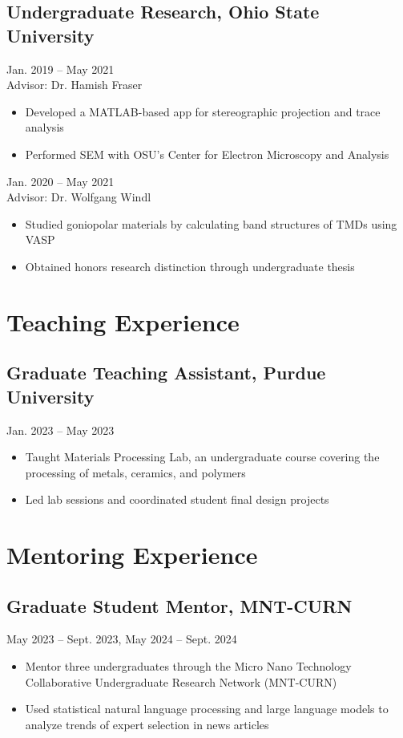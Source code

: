 \documentclass[11pt]{article}
\begin{document}
\subsection*{Undergraduate Research, Ohio State University}
Jan. 2019 -- May 2021 \\
Advisor: Dr. Hamish Fraser
\begin{itemize}[leftmargin=1.5em]
    \item Developed a MATLAB-based app for stereographic projection and trace analysis
    \item Performed SEM with OSU’s Center for Electron Microscopy and Analysis
\end{itemize}

Jan. 2020 -- May 2021 \\
Advisor: Dr. Wolfgang Windl
\begin{itemize}[leftmargin=1.5em]
    \item Studied goniopolar materials by calculating band structures of TMDs using VASP
    \item Obtained honors research distinction through undergraduate thesis
\end{itemize}

\section*{Teaching Experience}

\subsection*{Graduate Teaching Assistant, Purdue University}
Jan. 2023 -- May 2023
\begin{itemize}[leftmargin=1.5em]
    \item Taught Materials Processing Lab, an undergraduate course covering the processing of metals, ceramics, and polymers
    \item Led lab sessions and coordinated student final design projects
\end{itemize}

\section*{Mentoring Experience}

\subsection*{Graduate Student Mentor, MNT-CURN}
May 2023 -- Sept. 2023, May 2024 -- Sept. 2024
\begin{itemize}[leftmargin=1.5em]
    \item Mentor three undergraduates through the Micro Nano Technology Collaborative Undergraduate Research Network (MNT-CURN)
    \item Used statistical natural language processing and large language models to analyze trends of expert selection in news articles
\end{itemize}
\end{document}
